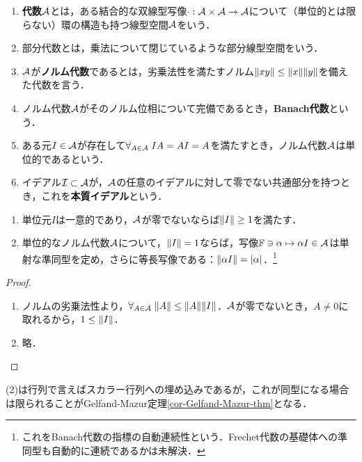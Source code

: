 \documentclass[uplatex,dvipdfmx]{jsreport}
\begin{document}
\begin{definition}\mbox{}
    \begin{enumerate}
        \item \textbf{代数}$\mathcal{A}$とは，ある結合的な双線型写像$\cdot:\mathcal{A}\times \mathcal{A}\to \mathcal{A}$について（単位的とは限らない）環の構造も持つ線型空間$\mathcal{A}$をいう．
        \item 部分代数とは，乗法について閉じているような部分線型空間をいう．
        \item $\mathcal{A}$が\textbf{ノルム代数}であるとは，劣乗法性を満たすノルム$\|xy\|\le\|x\|\|y\|$を備えた代数を言う．
        \item ノルム代数$\mathcal{A}$がそのノルム位相について完備であるとき，\textbf{Banach代数}という．
        \item ある元$I\in\mathcal{A}$が存在して$\forall_{A\in\mathcal{A}}\;IA=AI=A$を満たすとき，ノルム代数$\mathcal{A}$は単位的であるという．
        \item イデアル$\mathcal{I}\subset\mathcal{A}$が，$\mathcal{A}$の任意のイデアルに対して零でない共通部分を持つとき，これを\textbf{本質イデアル}という．
    \end{enumerate}
\end{definition}

\begin{lemma}[単位元の性質について]\mbox{}
    \begin{enumerate}
        \item 単位元$I$は一意的であり，$\mathcal{A}$が零でないならば$\|I\|\ge 1$を満たす．
        \item 単位的なノルム代数$\mathcal{A}$について，$\|I\|=1$ならば，写像$\mathbb{F}\ni\alpha\mapsto\alpha I\in\mathcal{A}$は単射な準同型を定め，さらに等長写像である：$\|\alpha I\|=\lvert\alpha\rvert$．\footnote{これをBanach代数の指標の自動連続性という．Frechet代数の基礎体への準同型も自動的に連続であるかは未解決．}
    \end{enumerate}
\end{lemma}
\begin{proof}\mbox{}
    \begin{enumerate}
        \item ノルムの劣乗法性より，$\forall_{A\in\mathcal{A}}\;\|A\|\le\|A\|\|I\|$．$\mathcal{A}$が零でないとき，$A\ne 0$に取れるから，$1\le\|I\|$．
        \item 略．
    \end{enumerate}
\end{proof}
\begin{remarks}
    (2)は行列で言えばスカラー行列への埋め込みであるが，これが同型になる場合は限られることがGelfand-Mazur定理\ref{cor-Gelfand-Mazur-thm}となる．
\end{remarks}
\end{document}
